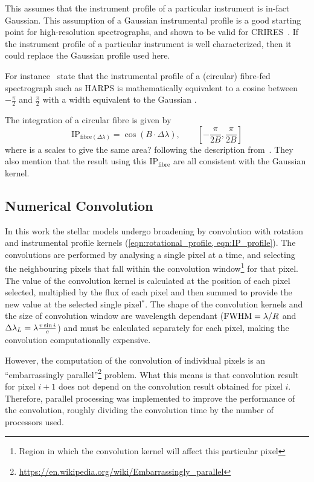 This assumes that the instrument profile of a particular instrument is in-fact Gaussian.
This assumption of a Gaussian instrumental profile is a good starting point for high-resolution spectrographs, and shown to be valid for CRIRES~\citep{seifahrt_synthesising_2010}.
If the instrument profile of a particular instrument is well characterized, then it could replace the Gaussian profile used here.

For instance~\citet{artigau_optical_2018}  state that the instrumental profile of a (circular) fibre-fed spectrograph such as {HARPS} is mathematically equivalent to a cosine between $-\frac{\pi}{2}$ and $\frac{\pi}{2}$ with a width equivalent to the Gaussian {\fwhm}.

The integration of a circular fibre is given by
\begin{equation}
\textrm{IP}_{\textrm{fibre}(\Delta\lambda)} = \cos(B\cdot\Delta\lambda) ,  \hspace{2em} [-\frac{\pi}{2 B}, \frac{\pi}{2 B}]
\end{equation}
where  is a scales to give the same area? 
following the description from~\citet{artigau_optical_2018}.  They also mention that the result using this $\textrm{IP}_{\textrm{fibre}}$ are all consistent with the Gaussian kernel.

\subsection{Numerical Convolution}
\label{subsec:numerical_convolution}
In this work the stellar models undergo broadening by convolution with rotation and instrumental profile kernels (\cref{eqn:rotational_profile, eqn:IP_profile}).
The convolutions are performed by analysing a single pixel at a time, and selecting the neighbouring pixels that fall within the convolution window\footnote{Region in which the convolution kernel will affect this particular pixel} for that pixel.
The value of the convolution kernel is calculated at the position of each pixel selected, multiplied by the flux of each pixel and then summed to provide the new value at the selected single pixel{$^{\textbf{*}}$}.
 The shape of the convolution kernels and the size of convolution window are wavelength dependant (${\textrm{FWHM}}=\lambda / R$ and $\Delta\lambda_{L}=\lambda \frac{v\sin{i}}{c}$) and must be calculated separately for each pixel, making the convolution computationally expensive.

However, the computation of the convolution of individual pixels is an ``embarrassingly parallel''\footnote{\href{https://en.wikipedia.org/wiki/Embarrassingly\_parallel}{https://en.wikipedia.org/wiki/Embarrassingly\_parallel}} problem.
What this means is that convolution result for pixel $i+1$ does not depend on the convolution result obtained for pixel $i$.
Therefore, parallel processing was implemented to improve the performance of the convolution, roughly dividing the convolution time by the number of processors used.

